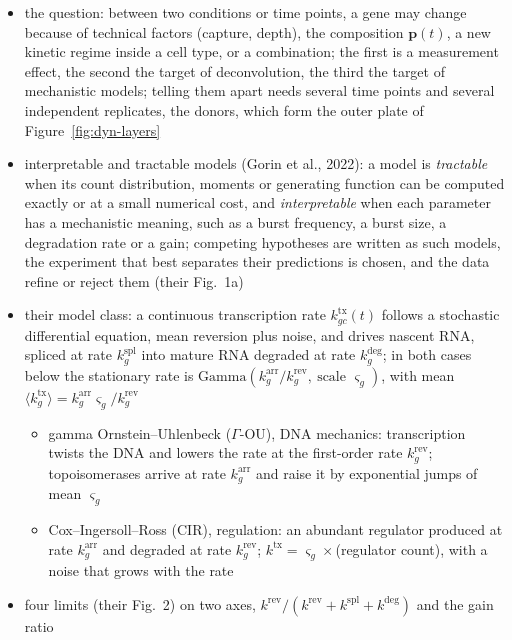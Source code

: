 \begin{itemize}
  \item the question: between two conditions or time points, a gene may change because of technical factors
        (capture, depth), the composition \(\boldsymbol{p}(t)\), a new kinetic regime inside a cell type, or a
        combination; the first is a measurement effect, the second the target of deconvolution, the third the target of
        mechanistic models; telling them apart needs several time points and several independent replicates, the
        donors, which form the outer plate of Figure~\ref{fig:dyn-layers}
  \item interpretable and tractable models (Gorin et al., 2022): a model is \emph{tractable} when its count
        distribution, moments or generating function can be computed exactly or at a small numerical cost, and
        \emph{interpretable} when each parameter has a mechanistic meaning, such as a burst frequency, a burst size, a
        degradation rate or a gain; competing hypotheses are written as such models, the experiment that best
        separates their predictions is chosen, and the data refine or reject them (their Fig.~1a)
  \item their model class: a continuous transcription rate \(k^{\mathrm{tx}}_{gc}(t)\) follows a stochastic differential equation,
        mean reversion plus noise, and drives nascent RNA, spliced at rate \(k^{\mathrm{spl}}_{g}\) into mature RNA degraded
        at rate \(k^{\mathrm{deg}}_{g}\); in both cases below the stationary rate is
        \(\mathrm{Gamma}(k^{\mathrm{arr}}_{g}/k^{\mathrm{rev}}_{g},\ \text{scale }\varsigma_{g})\), with mean
        \(\langle k^{\mathrm{tx}}_{g}\rangle=k^{\mathrm{arr}}_{g}\varsigma_{g}/k^{\mathrm{rev}}_{g}\)
  \begin{itemize}
    \item gamma Ornstein--Uhlenbeck (\(\Gamma\)-OU), DNA mechanics: transcription twists the DNA and lowers the rate at the
          first-order rate \(k^{\mathrm{rev}}_{g}\); topoisomerases arrive at rate \(k^{\mathrm{arr}}_{g}\) and raise it by exponential jumps of
          mean \(\varsigma_{g}\)
    \item Cox--Ingersoll--Ross (CIR), regulation: an abundant regulator produced at rate \(k^{\mathrm{arr}}_{g}\) and degraded at
          rate \(k^{\mathrm{rev}}_{g}\); \(k^{\mathrm{tx}}=\varsigma_{g}\times\)(regulator count), with a noise that grows with the rate
  \end{itemize}
  \item four limits (their Fig.~2) on two axes, \(k^{\mathrm{rev}}/(k^{\mathrm{rev}}+k^{\mathrm{spl}}+k^{\mathrm{deg}})\) and the gain ratio

\end{itemize}
